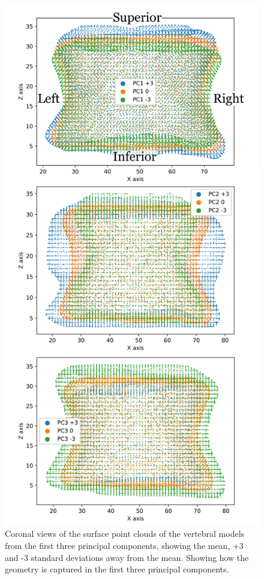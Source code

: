 \begin{figure}[p]
  \centering
  \includegraphics[width=.65\textwidth]{Chapters/Chapter_PCA_images/PC1_2_3_Coronal.pdf}
  \caption{Coronal views of the surface point clouds of the vertebral models from the first three principal components, showing the mean, +3 and -3 standard deviations away from the mean. Showing how the geometry is captured in the first three principal components.}
  \label{fig:PC1_2_3_Coronal}
\end{figure}




